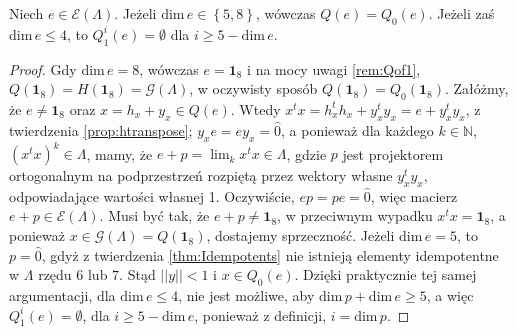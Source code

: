 {\begin{Theorem}
Niech $e \in \mathcal{E}(\Lambda)$.
Jeżeli $\mathrm{dim} \, e \in \left \{ 5,8 \right \}$,
wówczas
$Q(e) = Q_{0}(e)$.
Jeżeli zaś $\mathrm{dim} \, e \leq 4$,
to
$Q_{1}^{i}(e) = \emptyset$ dla $i \geq 5 - \mathrm{dim} \, e$.
\end{Theorem}
\begin{proof}
    Gdy $\mathrm{dim} \, e = 8$,
    wówczas $e = \mathbf{1}_{8}$ i na mocy uwagi \ref{rem:Qof1},
    $Q(\mathbf{1}_{8}) = H(\mathbf{1}_{8}) = \mathcal{G}(\Lambda)$,
    w oczywisty sposób $Q(\mathbf{1}_{8}) = Q_{0}(\mathbf{1}_{8})$.
    Załóżmy, że $e \neq \mathbf{1}_{8}$
oraz $x = h_{x} + y_{x} \in Q(e)$.
Wtedy $x^{t} x = h_{x}^{t} h_{x} + y_{x}^{t} y_{x} = e + y_{x}^{t} y_{x}$,
z twierdzenia \ref{prop:htranspose};
    $y_{x} e = e y_{x} = \hat{0}$,
a ponieważ dla każdego $k \in \mathbb{N}$, $(x^{t} x)^{k} \in \Lambda$,
mamy, że $e + p = \lim_{k} x^{t} x \in \Lambda$,
gdzie $p$ jest projektorem ortogonalnym na podprzestrzeń rozpiętą przez wektory
własne $y_{x}^{t} y_{x}$, odpowiadające wartości własnej 1.
Oczywiście, $e p = p e = \hat{0}$, więc
macierz $e + p \in \mathcal{E}(\Lambda)$.
Musi być tak, że $e + p \neq \mathbf{1}_{8}$,
w przeciwnym wypadku $x^{t} x = \mathbf{1}_{8}$, a ponieważ
    $x \in \mathcal{G}(\Lambda) = Q(\mathbf{1}_{8})$, dostajemy sprzeczność.
Jeżeli $\mathrm{dim}\,e = 5$, to $p = \hat{0}$,
gdyż z twierdzenia \ref{thm:Idempotents}
nie istnieją elementy idempotentne w  $\Lambda$
rzędu $6$ lub $7$.
Stąd $||y|| < 1$ i $x \in Q_{0}(e)$.
Dzięki praktycznie tej samej argumentacji, dla $\textrm{dim}\, e \leq 4$,
nie jest możliwe, aby $\mathrm{dim} \, p  + \mathrm{dim}\, e \geq 5$,
a więc $Q_{1}^{i}(e) = \emptyset$, dla $i \geq 5 - \mathrm{dim} \, e$,
ponieważ z definicji, $i = \textrm{dim}\,p$.
\end{proof}

}
